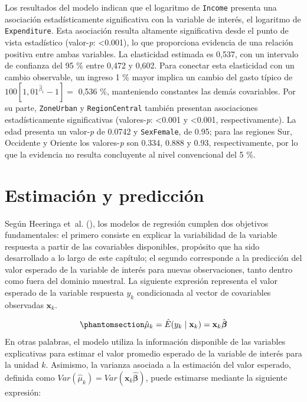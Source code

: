 \documentclass[
  spanish,
  11pt,
  letterpaper,
  oneside,
  open=any]{scrbook}
\begin{document}
Los resultados del modelo indican que el logaritmo de \texttt{Income}
presenta una asociación estadísticamente significativa con la variable
de interés, el logaritmo de \texttt{Expenditure}. Esta asociación
resulta altamente significativa desde el punto de vista estadístico
(valor-\emph{p}: \textless0.001), lo que proporciona evidencia de una
relación positiva entre ambas variables. La elasticidad estimada es
0,537, con un intervalo de confianza del 95 \% entre 0,472 y 0,602. Para
conectar esta elasticidad con un cambio observable, un ingreso 1 \%
mayor implica un cambio del gasto típico de
\(100[1{,}01^{\hat\beta_1}-1]=\) 0,536 \%, manteniendo constantes las
demás covariables. Por su parte, \texttt{ZoneUrban} y
\texttt{RegionCentral} también presentan asociaciones estadísticamente
significativas (valores-\emph{p}: \textless0.001 y \textless0.001,
respectivamente). La edad presenta un valor-\emph{p} de 0.0742 y
\texttt{SexFemale}, de 0.95; para las regiones Sur, Occidente y Oriente
los valores-\emph{p} son 0.334, 0.888 y 0.93, respectivamente, por lo
que la evidencia no resulta concluyente al nivel convencional del 5 \%.

\section{Estimación y predicción}\label{estimacion-y-prediccion}

Según Heeringa et~al. (),
los modelos de regresión cumplen dos objetivos fundamentales: el primero
consiste en explicar la variabilidad de la variable respuesta a partir
de las covariables disponibles, propósito que ha sido desarrollado a lo
largo de este capítulo; el segundo corresponde a la predicción del valor
esperado de la variable de interés para nuevas observaciones, tanto
dentro como fuera del dominio muestral. La siguiente expresión
representa el valor esperado de la variable respuesta \(y_k\)
condicionada al vector de covariables observadas \(\mathbf{x}_{k}\).

\begin{equation}\protect\phantomsection\label{eq-media-condicional}{
\hat \mu_k = \hat{E}(y_{k}\mid\mathbf{x}_{k})=\mathbf{x}_{k}\hat{\boldsymbol{\beta}}
}\end{equation} En otras palabras, el modelo utiliza la información
disponible de las variables explicativas para estimar el valor promedio
esperado de la variable de interés para la unidad \(k\). Asimismo, la
varianza asociada a la estimación del valor esperado, definida como
\({Var}(\hat{\mu}_k) = {Var}(\mathbf{x}_{k}\hat{\boldsymbol{\beta}})\),
puede estimarse mediante la siguiente expresión:
\end{document}
